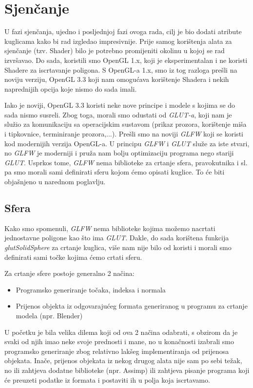 \chapter{Sjenčanje}
U fazi sjenčanja, ujedno i posljednjoj fazi ovoga rada, cilj je bio dodati atribute kuglicama kako bi rad izgledao impresivnije. Prije samog korištenja alata za sjenčanje (tzv. Shader) bilo je potrebno promijeniti okolinu u kojoj se rad izvršavao. Do sada, koristili smo OpenGL 1.x, koji je eksperimentalan i ne koristi Shadere za iscrtavanje poligona. S OpenGL-a 1.x, smo iz tog razloga prešli na noviju verziju, OpenGL 3.3 koji nam omogućava korištenje Shadera i nekih naprednijih opcija koje nismo do sada imali.

Iako je noviji, OpenGL 3.3 koristi neke nove principe i modele s kojima se do sada nismo susreli. Zbog toga, morali smo odustati od \emph{GLUT-a}, koji nam je služio za komunikaciju sa operacijskim sustavom (prikaz prozora, korištenje miša i tipkovnice, terminiranje prozora,...). Prešli smo na noviji \emph{GLFW} koji se koristi kod modernijih verzija OpenGL-a. U principu \emph{GLFW} i \emph{GLUT} služe za iste stvari, no \emph{GLFW} je moderniji i pruža nam bolju optimizaciju programa nego stariji \emph{GLUT}. Usprkos tome, \emph{GLFW} nema biblioteke za crtanje sfera, pravokutnika i sl. pa smo morali sami definirati sferu kojom ćemo opisati kuglice. To će biti objašnjeno u narednom poglavlju.
\newpage
\section{Sfera}
Kako smo spomenuli, \emph{GLFW} nema biblioteke kojima možemo nacrtati jednostavne poligone kao što ima \emph{GLUT}. Dakle, do sada korištena funkcija \emph{glutSolidSphere} za crtanje kuglica, više nam nije bilo od koristi i morali smo definirati sami točke kojima ćemo crtati sferu.

Za crtanje sfere postoje generalno 2 načina:
\begin{itemize}
	\item Programsko generiranje točaka, indeksa i normala
	\item Prijenos objekta iz odgovarajućeg formata generiranog u programu za crtanje modela (npr. Blender)
\end{itemize}
U početku je bila velika dilema koji od ova 2 načina odabrati, s obzirom da je svaki od njih imao neke svoje prednosti i mane, no u konačnosti izabrali smo programsko generiranje zbog relativno lakšeg implementiranja od prijenosa objekata. Inače, prijenos objekata iz nekog drugog alata nije sam po sebi težak, no ili zahtjeva dodatne biblioteke (npr. Assimp) ili zahtjeva pisanje programa koji će preuzeti podatke iz formata i postaviti ih u polja koja iscrtavamo.

